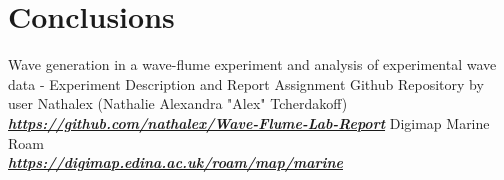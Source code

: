 \documentclass{article}
\begin{document}
	\section{Conclusions}
	\begin{thebibliography}{1}
		 Wave generation in a wave-flume experiment and analysis of experimental wave data - Experiment Description and Report Assignment
		 Github Repository by user Nathalex (Nathalie Alexandra "Alex" Tcherdakoff)\\ \href{https://github.com/nathalex/Wave-Flume-Lab-Report}{\textbf{\textit{https://github.com/nathalex/Wave-Flume-Lab-Report}}}
		 Digimap Marine Roam\\
		\href{https://digimap.edina.ac.uk/roam/map/marine}{\textit{\textbf{https://digimap.edina.ac.uk/roam/map/marine}}}
	\end{thebibliography}
\end{document}
